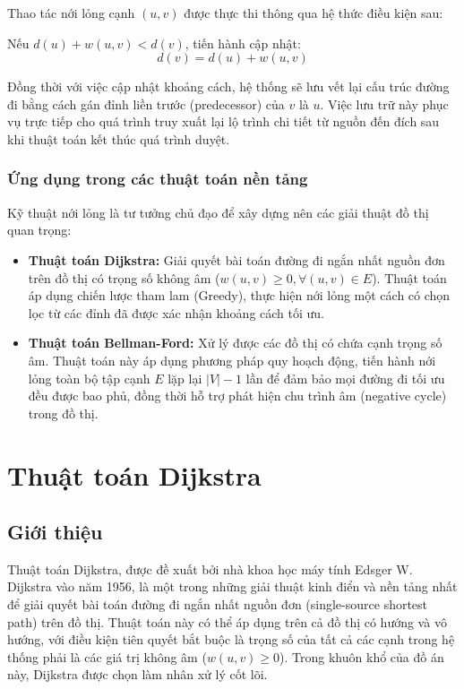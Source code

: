 \documentclass[12pt,a4paper,oneside]{report}
\begin{document}
Thao tác nới lỏng cạnh $(u, v)$ được thực thi thông qua hệ thức điều kiện sau:

Nếu $d(u) + w(u, v) < d(v)$, tiến hành cập nhật:
\begin{equation*}
    d(v) = d(u) + w(u, v)
\end{equation*}

Đồng thời với việc cập nhật khoảng cách, hệ thống sẽ lưu vết lại cấu trúc đường đi bằng cách gán đỉnh liền trước (predecessor) của $v$ là $u$. Việc lưu trữ này phục vụ trực tiếp cho quá trình truy xuất lại lộ trình chi tiết từ nguồn đến đích sau khi thuật toán kết thúc quá trình duyệt.

\subsubsection{Ứng dụng trong các thuật toán nền tảng}
Kỹ thuật nới lỏng là tư tưởng chủ đạo để xây dựng nên các giải thuật đồ thị quan trọng:
\begin{itemize}
    \item \textbf{Thuật toán Dijkstra:} Giải quyết bài toán đường đi ngắn nhất nguồn đơn trên đồ thị có trọng số không âm ($w(u, v) \ge 0, \forall (u, v) \in E$). Thuật toán áp dụng chiến lược tham lam (Greedy), thực hiện nới lỏng một cách có chọn lọc từ các đỉnh đã được xác nhận khoảng cách tối ưu.
    \item \textbf{Thuật toán Bellman-Ford:} Xử lý được các đồ thị có chứa cạnh trọng số âm. Thuật toán này áp dụng phương pháp quy hoạch động, tiến hành nới lỏng toàn bộ tập cạnh $E$ lặp lại $|V| - 1$ lần để đảm bảo mọi đường đi tối ưu đều được bao phủ, đồng thời hỗ trợ phát hiện chu trình âm (negative cycle) trong đồ thị.
\end{itemize}
\section{Thuật toán Dijkstra}
\subsection{Giới thiệu}
Thuật toán Dijkstra, được đề xuất bởi nhà khoa học máy tính Edsger W. Dijkstra vào năm 1956, là một trong những giải thuật kinh điển và nền tảng nhất để giải quyết bài toán đường đi ngắn nhất nguồn đơn (single-source shortest path) trên đồ thị. Thuật toán này có thể áp dụng trên cả đồ thị có hướng và vô hướng, với điều kiện tiên quyết bắt buộc là trọng số của tất cả các cạnh trong hệ thống phải là các giá trị không âm ($w(u,v) \ge 0$). Trong khuôn khổ của đồ án này, Dijkstra được chọn làm nhân xử lý cốt lõi.
\end{document}
